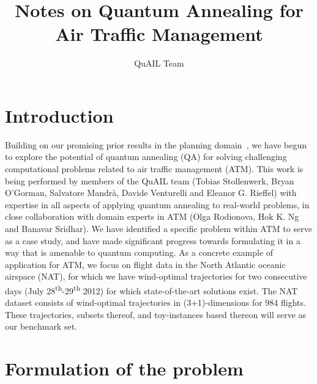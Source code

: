 \documentclass[twocolumn,9pt]{article}
\begin{document}
\title{Notes on Quantum Annealing for Air Traffic Management}
\author{QuAIL Team}
\maketitle

\section*{Introduction}\label{sec:intro}
Building on our promising prior results in the planning domain~\cite{rieffel:15,venturelli:15},
we have begun to explore the potential of quantum annealing (QA) for solving challenging computational 
problems related to air traffic management (ATM)\cite{rodionova:16, rodionova:thesis15}.
This work is being performed by members of the QuAIL team (Tobias Stollenwerk, Bryan O'Gorman, 
Salvatore Mandr\`a, Davide Venturelli and Eleanor G. Rieffel) with expertise in all aspects of 
applying quantum annealing to real-world problems, in close collaboration with domain experts 
in ATM (Olga Rodionova, Hok K. Ng and Banavar Sridhar).
We have identified a specific problem within ATM to serve as a case study, and have made significant 
progress towards formulating it in a way that is amenable to quantum computing. As a concrete example 
of application for ATM, we focus on flight data in the North Atlantic oceanic airspace (NAT), 
for which we have wind-optimal trajectories for two consecutive days 
(July 28\textsuperscript{th}-29\textsuperscript{th} 2012) for which state-of-the-art solutions exist. 
The NAT dataset consists of wind-optimal trajectories in (3+1)-dimensions for 984 flights. 
These trajectories, subsets thereof, and toy-instances based thereon will serve as our benchmark set.

\section*{Formulation of the problem}\label{sec:approach}
\end{document}
